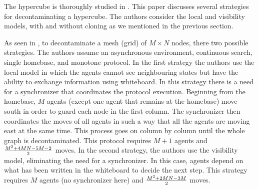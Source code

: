 The hypercube is thoroughly studied in \cite{floetal20}. This paper discusses several strategies for decontaminating a hypercube. The authors consider the local and visibility models, with and without cloning as we mentioned in the previous section.







As seen in \cite{floetal19}, to decontaminate a mesh (grid) of $M\times N$ nodes, there two possible strategies. The authors assume an asynchronous environment, continuous search, single homebase, and monotone protocol. In the first strategy the authors use the local model in which the agents cannot see neighbouring states but have the ability to exchange information using whiteboard. In this strategy there is a need for a synchronizer that coordinates the protocol execution. Beginning from the homebase, $M$ agents (except one agent that remains at the homebase) move south in order to guard each node in the first column. The synchronizer then coordinates the moves of all agents in such a way that all the agents are moving east at the same time.  This process goes on column by column until the whole graph is decontaminated. This protocol requires $M+1$ agents and ${M^2+4MN-5M-2}\over 2$ moves. In the second strategy, the authors use the visibility model, eliminating the need for a synchronizer. In this case, agents depend on what has been written in the whiteboard to decide the next step. This strategy requires $M$ agents (no synchronizer here) and ${M^2+2MN-3M}\over 2$ moves.

